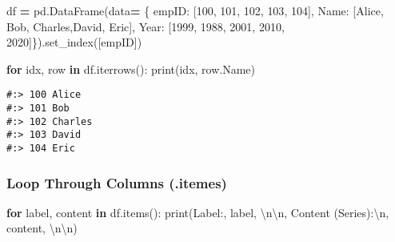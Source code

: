 \documentclass[
]{book}
\newenvironment{Shaded}{\begin{snugshade}}{\end{snugshade}}
\newcommand{\BuiltInTok}[1]{#1}
\newcommand{\CharTok}[1]{\textcolor[rgb]{0.5,0.5,0.5}{#1}}
\newcommand{\ControlFlowTok}[1]{\textcolor[rgb]{0.27,0.27,0.27}{\textbf{#1}}}
\newcommand{\DecValTok}[1]{\textcolor[rgb]{0.06,0.06,0.06}{#1}}
\newcommand{\KeywordTok}[1]{\textcolor[rgb]{0.27,0.27,0.27}{\textbf{#1}}}
\newcommand{\NormalTok}[1]{#1}
\newcommand{\OperatorTok}[1]{\textcolor[rgb]{0.43,0.43,0.43}{\textbf{#1}}}
\newcommand{\StringTok}[1]{\textcolor[rgb]{0.5,0.5,0.5}{#1}}
\begin{document}
\begin{Shaded}
\begin{Highlighting}[]
\NormalTok{df }\OperatorTok{=}\NormalTok{ pd.DataFrame(data}\OperatorTok{=}
\NormalTok{    \{ }\StringTok{\textquotesingle{}empID\textquotesingle{}}\NormalTok{:  [}\DecValTok{100}\NormalTok{,      }\DecValTok{101}\NormalTok{,    }\DecValTok{102}\NormalTok{,      }\DecValTok{103}\NormalTok{,     }\DecValTok{104}\NormalTok{],}
      \StringTok{\textquotesingle{}Name\textquotesingle{}}\NormalTok{:   [}\StringTok{\textquotesingle{}Alice\textquotesingle{}}\NormalTok{,  }\StringTok{\textquotesingle{}Bob\textquotesingle{}}\NormalTok{,  }\StringTok{\textquotesingle{}Charles\textquotesingle{}}\NormalTok{,}\StringTok{\textquotesingle{}David\textquotesingle{}}\NormalTok{, }\StringTok{\textquotesingle{}Eric\textquotesingle{}}\NormalTok{],}
      \StringTok{\textquotesingle{}Year\textquotesingle{}}\NormalTok{:   [}\DecValTok{1999}\NormalTok{,     }\DecValTok{1988}\NormalTok{,   }\DecValTok{2001}\NormalTok{,     }\DecValTok{2010}\NormalTok{,     }\DecValTok{2020}\NormalTok{]\}).set\_index([}\StringTok{\textquotesingle{}empID\textquotesingle{}}\NormalTok{])}

\ControlFlowTok{for}\NormalTok{ idx, row }\KeywordTok{in}\NormalTok{ df.iterrows():}
  \BuiltInTok{print}\NormalTok{(idx, row.Name)}
\end{Highlighting}
\end{Shaded}

\begin{verbatim}
#:> 100 Alice
#:> 101 Bob
#:> 102 Charles
#:> 103 David
#:> 104 Eric
\end{verbatim}

\hypertarget{loop-through-columns-.itemes}{%
\subsubsection{Loop Through Columns (.itemes)}\label{loop-through-columns-.itemes}}

\begin{Shaded}
\begin{Highlighting}[]
\ControlFlowTok{for}\NormalTok{ label, content }\KeywordTok{in}\NormalTok{ df.items():}
  \BuiltInTok{print}\NormalTok{(}\StringTok{\textquotesingle{}Label:\textquotesingle{}}\NormalTok{,            label,   }\StringTok{\textquotesingle{}}\CharTok{\textbackslash{}n\textbackslash{}n}\StringTok{\textquotesingle{}}\NormalTok{, }
        \StringTok{\textquotesingle{}Content (Series):}\CharTok{\textbackslash{}n}\StringTok{\textquotesingle{}}\NormalTok{, content, }\StringTok{\textquotesingle{}}\CharTok{\textbackslash{}n\textbackslash{}n}\StringTok{\textquotesingle{}}\NormalTok{)}
\end{Highlighting}
\end{Shaded}
\end{document}
